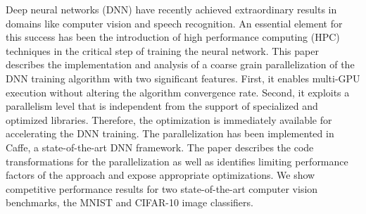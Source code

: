 Deep neural networks (DNN) have recently achieved extraordinary
results in domains like computer vision and speech recognition.
An essential element for this success
has been the introduction of high performance computing (HPC)
techniques in the critical step of training the neural network. 
This paper describes the implementation and
analysis of a coarse grain parallelization of the DNN training algorithm
with two significant features. 
First, it enables multi-GPU
execution without altering the algorithm convergence rate. Second,
it exploits a parallelism level that is independent from the support
of specialized and optimized libraries. 
Therefore, the optimization
is immediately available for accelerating the DNN training. 
The parallelization
has been implemented in Caffe, a state-of-the-art DNN framework. 
The paper describes the code transformations for the parallelization as well as identifies limiting performance factors of the approach and expose appropriate optimizations. 
We show competitive performance
results for two state-of-the-art computer vision benchmarks, the
MNIST and CIFAR-10 image classifiers.
